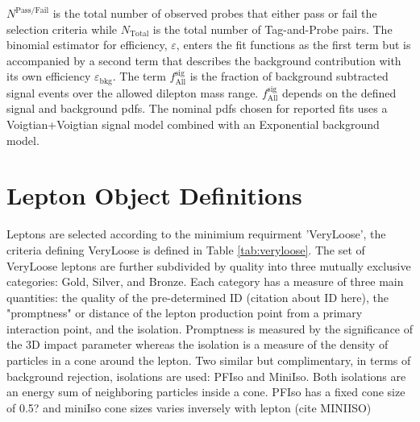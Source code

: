 $N^{\text{Pass/Fail}}$ is the total number of observed probes that either pass or fail the selection criteria while $N_{\text{Total}}$ is the total number of Tag-and-Probe pairs.
The binomial estimator for efficiency, $\varepsilon$, enters the fit functions as the first term but is accompanied by a second term that describes the background contribution with its own efficiency $\varepsilon_{\text{bkg}}$.  The term $f^{\text{sig}}_{\text{All}}$ is the fraction of background subtracted signal events over the allowed dilepton mass range.  $f^{\text{sig}}_{\text{All}}$ depends on the defined signal and background pdfs. The nominal pdfs chosen for reported fits uses a Voigtian+Voigtian signal model combined with an Exponential background model. 





\section{Lepton Object Definitions}


Leptons are selected according to the minimium requirment 'VeryLoose', the criteria defining VeryLoose is defined in Table \ref{tab:veryloose}.  The set of VeryLoose leptons are further subdivided by quality into three mutually exclusive categories: Gold, Silver, and Bronze. Each category has a measure of three main quantities: the quality of the pre-determined ID (citation about ID here), the "promptness" or distance of the lepton production point from a primary interaction point, and the isolation. Promptness is measured by the significance of the 3D impact parameter whereas the isolation is a measure of the density of particles in a cone around the lepton. Two similar but complimentary, in terms of background rejection, isolations are used: PFIso and MiniIso. Both isolations are an energy sum of neighboring particles inside a cone. PFIso has a fixed cone size of 0.5? and miniIso cone sizes varies inversely with lepton \pt (cite MINIISO)

